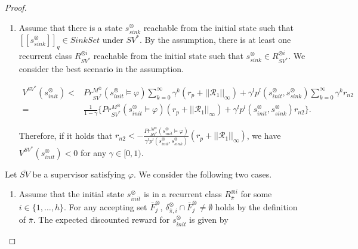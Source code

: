 \documentclass[10pt]{article}
\newtheorem{proof}{Proof}
\newcommand{\myspqsink}{\ensuremath{[\![s^{\otimes}_{sink}]\!]}_q}
\begin{document}
\begin{proof}
\begin{enumerate}
  \item Assume that there is  a state $s^{\otimes}_{sink}$ reachable from the initial state such that $\myspqsink \in SinkSet$ under $SV^{\ast}$. By the assumption, there is at least one recurrent class $R^{\otimes i}_{SV^{\ast}}$ reachable from the initial state such that $s^{\otimes}_{sink} \in R^{\otimes i}_{SV^{\ast}}$. We consider the best scenario in the assumption.

  \begin{align}
    V^{SV^{\ast}}(s^{\otimes}_{init}) < & Pr^{M^{\otimes}}_{SV^{\ast}}(s^{\otimes}_{init} \models \varphi) \sum_{k=0}^{\infty} \gamma^k (r_p + ||\mathcal{R}_1||_{\infty}) + \gamma^l p^l(s^{\otimes}_{init}, s^{\otimes}_{sink}) \sum_{k=0}^{\infty} \gamma^k r_{n2} \nonumber \\
    = & \frac{1}{1-\gamma} \{ Pr^{M^{\otimes}}_{SV^{\ast}}(s^{\otimes}_{init} \models \varphi) (r_p + ||\mathcal{R}_1||_{\infty}) + \gamma^l p^l (s^{\otimes}_{init}, s^{\otimes}_{sink}) r_{n2} \}. \nonumber
  \end{align}

  Therefore, if it holds that $r_{n2} < - \frac{Pr^{M^{\otimes}}_{SV^{\ast}}(s^{\otimes}_{init} \models \varphi)}{ \gamma^l p^l (s^{\otimes}_{init}, s^{\otimes}_{sink})} (r_p + ||\mathcal{R}_1||_{\infty})$, we have $V^{SV^{\ast}}(s^{\otimes}_{init}) < 0$ for any $\gamma \in [0,1)$.

\end{enumerate}
  Let $\bar{SV}$ be a supervisor satisfying $\varphi$. We consider the following two cases.

  \begin{enumerate}
    \vspace{2mm}
    \item Assume that the initial state $s^{\otimes}_{init}$ is in a recurrent class $R^{\otimes i}_{\bar{\pi}}$ for some $ i \in \{ 1,\ldots,h \} $.
    For any accepting set $\bar{F}^{\otimes}_j$, $\delta^{\otimes}_{\bar{\pi},i} \cap \bar{F}^{\otimes}_j \neq \emptyset$ holds by the definition of $\bar{\pi}$. The expected discounted reward for $s^{\otimes}_{init}$ is given by


\end{enumerate}
\end{proof}
\end{document}
